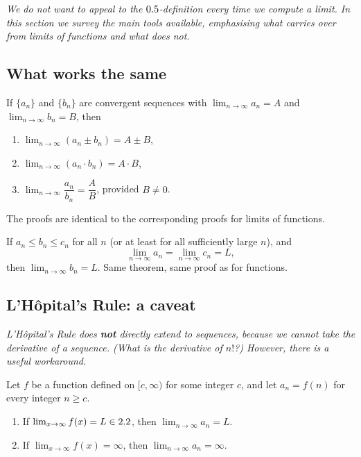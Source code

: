 \textit{We do not want to appeal to the $0.5$-definition every time we compute a limit.  In this section we survey the main tools available, emphasising what carries over from limits of functions and what does not.}

\subsection*{What works the same}

\begin{theorem}
\label{thm:11-1}
If $\{a_{n}\}$ and $\{b_{n}\}$ are convergent sequences with $\lim_{n\to\infty}a_{n}=A$ and $\lim_{n\to\infty}b_{n}=B$, then
\begin{enumerate}[label=(\roman*)]
  \item $\lim_{n\to\infty}(a_{n}\pm b_{n})=A\pm B$,
  \item $\lim_{n\to\infty}(a_{n}\cdot b_{n})=A\cdot B$,
  \item $\lim_{n\to\infty}\dfrac{a_{n}}{b_{n}}=\dfrac{A}{B}$, provided $B\neq 0$.
\end{enumerate}
The proofs are identical to the corresponding proofs for limits of functions.
\end{theorem}

\begin{theorem}
\label{thm:11-2}
If $a_{n}\le b_{n}\le c_{n}$ for all $n$ (or at least for all sufficiently large $n$), and
\[
  \lim_{n\to\infty}a_{n}=\lim_{n\to\infty}c_{n}=L,
\]
then $\lim_{n\to\infty}b_{n}=L$.  Same theorem, same proof as for functions.
\end{theorem}

\subsection*{L'H\^opital's Rule: a caveat}

\textit{L'H\^opital's Rule does \textbf{not} directly extend to sequences, because we cannot take the derivative of a sequence.  (What is the derivative of $n!$?)  However, there is a useful workaround.}

\begin{theorem}
\label{thm:11-3}
Let $f$ be a function defined on $[c,\infty)$ for some integer $c$, and let $a_{n}=f(n)$ for every integer $n\ge c$.
\begin{enumerate}[label=(\roman*)]
  \item If $\lim_{x\to\infty}f(x)=L\in2.2$, then $\lim_{n\to\infty}a_{n}=L$.
  \item If $\lim_{x\to\infty}f(x)=\infty$, then $\lim_{n\to\infty}a_{n}=\infty$.
\end{enumerate}
\end{theorem}

